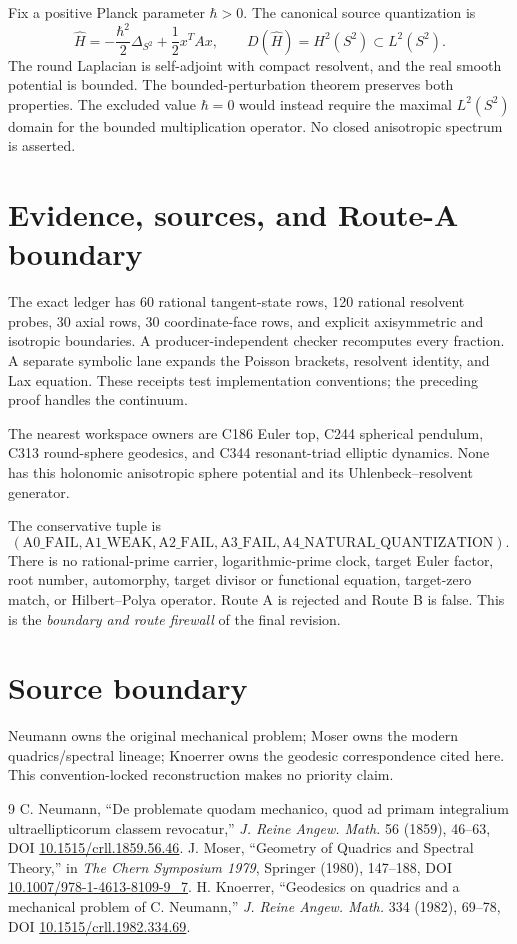 \documentclass[10pt]{article}
\begin{document}
Fix a positive Planck parameter $\hbar>0$.  The canonical source quantization is
\begin{equation}\label{eq:quantum}
 \widehat H=-\frac{\hbar^2}{2}\Delta_{S^2}+\frac12x^TAx,
 \qquad D(\widehat H)=H^2(S^2)\subset L^2(S^2).
\end{equation}
The round Laplacian is self-adjoint with compact resolvent, and the real
smooth potential is bounded.  The bounded-perturbation theorem preserves
both properties.  The excluded value $\hbar=0$ would instead require the
maximal $L^2(S^2)$ domain for the bounded multiplication operator.  No closed
anisotropic spectrum is asserted.

\section{Evidence, sources, and Route-A boundary}
The exact ledger has 60 rational tangent-state rows, 120 rational resolvent
probes, 30 axial rows, 30 coordinate-face rows, and explicit axisymmetric
and isotropic boundaries.  A producer-independent checker recomputes every
fraction.  A separate symbolic lane expands the Poisson brackets, resolvent
identity, and Lax equation.  These receipts test implementation conventions;
the preceding proof handles the continuum.

The nearest workspace owners are C186 Euler top, C244 spherical pendulum,
C313 round-sphere geodesics, and C344 resonant-triad elliptic dynamics.  None
has this holonomic anisotropic sphere potential and its Uhlenbeck--resolvent
generator.

The conservative tuple is
\[
 (\mathrm{A0\_FAIL},\mathrm{A1\_WEAK},\mathrm{A2\_FAIL},
  \mathrm{A3\_FAIL},\mathrm{A4\_NATURAL\_QUANTIZATION}).
\]
There is no rational-prime carrier, logarithmic-prime clock, target Euler
factor, root number, automorphy, target divisor or functional equation,
target-zero match, or Hilbert--Polya operator.  Route A is rejected and
Route B is false.  This is the \emph{boundary and route firewall} of the
final revision.
\fi

\section*{Source boundary}
Neumann owns the original mechanical problem; Moser owns the modern
quadrics/spectral lineage; Knoerrer owns the geodesic correspondence cited
here.  This convention-locked reconstruction makes no priority claim.

\begin{thebibliography}{9}
C. Neumann, ``De problemate quodam mechanico, quod ad primam integralium
ultraellipticorum classem revocatur,'' \emph{J. Reine Angew. Math.} 56
(1859), 46--63, DOI \url{10.1515/crll.1859.56.46}.
J. Moser, ``Geometry of Quadrics and Spectral Theory,'' in
\emph{The Chern Symposium 1979}, Springer (1980), 147--188,
DOI \url{10.1007/978-1-4613-8109-9_7}.
H. Knoerrer, ``Geodesics on quadrics and a mechanical problem of C. Neumann,''
\emph{J. Reine Angew. Math.} 334 (1982), 69--78,
DOI \url{10.1515/crll.1982.334.69}.
\end{thebibliography}
\end{document}
